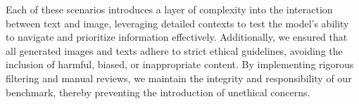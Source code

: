 Each of these scenarios introduces a layer of complexity into the interaction between text and image, leveraging detailed contexts to test the model's ability to navigate and prioritize information effectively. Additionally, we ensured that all generated images and texts adhere to strict ethical guidelines, avoiding the inclusion of harmful, biased, or inappropriate content. By implementing rigorous filtering  and manual reviews, we maintain the integrity and responsibility of our benchmark, thereby preventing the introduction of unethical concerns.






 